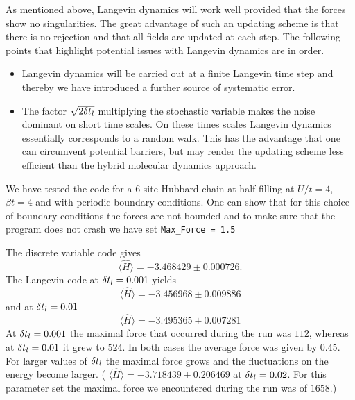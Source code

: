 As mentioned above, Langevin dynamics will work well  provided that  the forces show  no  singularities.     The great advantage of such an updating scheme is that there is no rejection and  that all  fields are updated at each step.  The following points that highlight potential issues with Langevin dynamics are in order.
\begin{itemize}
\item   Langevin dynamics will be carried out at a finite  Langevin time step and thereby we have introduced a further source of systematic error.
\item   The factor $\sqrt{2 \delta t_{l}} $   multiplying the stochastic variable makes the  noise dominant  on short time scales.  On these times scales  Langevin dynamics essentially  corresponds to a random walk. This has the advantage that one can circumvent potential barriers, but  may render the updating scheme less  efficient than the hybrid molecular  dynamics approach.
\end{itemize}

We have tested the code for a 6-site Hubbard chain at half-filling  at $U/t = 4$,  $\beta t = 4$    and with periodic boundary conditions.   One can show that for this choice of boundary conditions the   forces are not bounded 
and to make sure that the program does not   crash we have  set \texttt{Max\_Force = 1.5}  


 The discrete  variable code gives
\begin{equation}
 \langle  \hat{H} \rangle  =  -3.468429   \pm     0.000726.
\end{equation} 
The Langevin code at $ \delta t_{l} = 0.001$  yields 
\begin{equation}
 \langle  \hat{H} \rangle  =  -3.456968   \pm   0.009886 
\end{equation} 
and at $ \delta t_{l} = 0.01$ 
\begin{equation}
 \langle  \hat{H} \rangle  = -3.495365    \pm  0.007281 
\end{equation} 
 At $ \delta t_{l} = 0.001$   the maximal force that occurred during the run was 
$ 112$, whereas at $ \delta t_{l} = 0.01$ it grew to $524$.    In both cases the average force was given by $0.45$.   For larger values of  $ \delta t_{l} $ the maximal force grows and the fluctuations on the energy become  larger.  
( $ \langle  \hat{H} \rangle  =  -3.718439    \pm   0.206469 $  at $ \delta t_{l} = 0.02$. For this parameter set  the maximal force we encountered during the run was of $1658$.)

